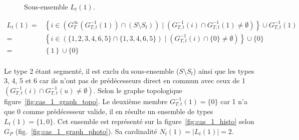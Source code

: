 \begin{figure}[!ht]
{		  
	      }\caption{Sous-ensemble $L_t(1)$.}
	  \label{fig:cas_1}
	\end{figure}


	\begin{equation}
	 \begin{split}
	  L_t(1) = & \left\{ i \in \left( G_T^{\infty}(G_{T,t}^{-1}(1)) \cap ( S \setminus S_t ) \right) \;|\; \left( G_{T,t}^{-1} (i) \cap G_{T,t}^{-1} (1) \neq \emptyset \right) \right\} \cup  G_{T,t}^{-1}(1)\\
		 = & \left\{ i \in \left( \{1,2,3,4,6,5\} \cap \{1,3,4,6,5\} \right) \;|\; \left( G_{T,t}^{-1} (i) \cap \{0\} \neq \emptyset \right) \right\} \cup  \{0\}\\
		 = & \left\{1 \right\} \cup  \{0\}\\
	 \end{split}
	 \label{eq:cas1}
	\end{equation}

	Le type 2 étant segmenté, il est exclu du sous-ensemble ($S \setminus S_t$) ainsi que les types 3, 4, 5 et 6 car ils n'ont pas de prédécesseurs direct en commun avec ceux de 1 $\left( G_{T,t}^{-1} (i) \cap G_{T,t}^{-1} (u) \neq \emptyset \right)$. Selon le graphe topologique figure~\ref{fig:cas_1_graph_topo}. Le deuxième membre $G_{T,t}^{-1}(1) = \{0\}$ car 1 n'a que 0 comme prédécesseur valide, il en résulte un ensemble de types $L_t(1) =  \{1, 0\}$. Cet ensemble est représenté sur la figure~\ref{fig:cas_1_histo} selon $G_{P}$ (fig.~\ref{fig:cas_1_graph_photo}). Sa cardinalité $N_t(1)=\left|{L_t(1)}\right| = 2$.\vspace{1em}
	
